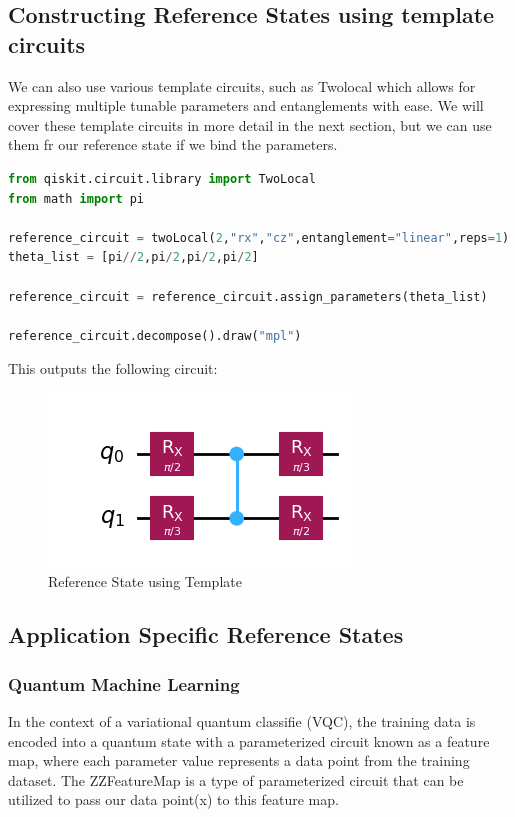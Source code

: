 \documentclass[12pt, oneside]{book}
\theoremstyle{definition}
\theoremstyle{definition}
\theoremstyle{remark}
\begin{document}
\subsection{Constructing Reference States using template circuits}
We can also use various template circuits, such as Twolocal which allows for expressing multiple tunable parameters and entanglements with ease. We will cover these template circuits in more detail in the next section, but we can use them fr our reference state if we bind the parameters.
\begin{lstlisting}[language=Python]
from qiskit.circuit.library import TwoLocal
from math import pi

reference_circuit = twoLocal(2,"rx","cz",entanglement="linear",reps=1)
theta_list = [pi//2,pi/2,pi/2,pi/2]

reference_circuit = reference_circuit.assign_parameters(theta_list)

reference_circuit.decompose().draw("mpl")
\end{lstlisting}
This outputs the following circuit:
\begin{figure}[H]
    \centering
    \includegraphics[width=0.5\linewidth]{../images/ref_state_template.png}
    \caption{Reference State using Template}
    \label{fig:ref_state_template}
\end{figure}

\subsection{Application Specific Reference States}
\subsubsection{Quantum Machine Learning}
In the context of a variational quantum classifie (VQC), the training data is encoded into a quantum state with a parameterized circuit known as a feature map, where each parameter value represents a data point from the training dataset. The ZZFeatureMap is a type of parameterized circuit that can be utilized to pass our data point(x) to this feature map.
\end{document}
